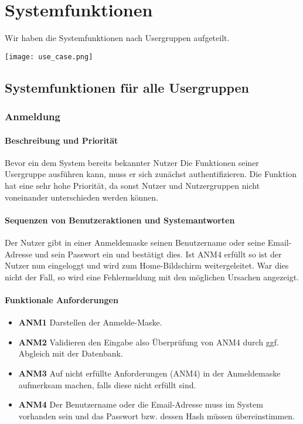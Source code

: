 \section{Systemfunktionen}
\label{system_features}

Wir haben die Systemfunktionen nach Usergruppen aufgeteilt.

\texttt{[image: use\_case.png]}

\subsection{Systemfunktionen für alle Usergruppen}
\subsubsection{Anmeldung}
\paragraph{Beschreibung und Priorität}

Bevor ein dem System bereits bekannter Nutzer Die Funktionen seiner Usergruppe ausführen kann, muss er sich zunächst authentifizieren. Die Funktion hat eine sehr hohe Priorität, da sonst Nutzer und Nutzergruppen nicht voneinander unterschieden werden können.

\paragraph{Sequenzen von Benutzeraktionen und Systemantworten}

Der Nutzer gibt in einer Anmeldemaske seinen Benutzername oder seine Email-Adresse und sein Passwort ein und bestätigt dies. Ist ANM4 erfüllt so ist der Nutzer nun eingeloggt und wird zum Home-Bildschirm weitergeleitet. War dies nicht der Fall, so wird eine Fehlermeldung mit den möglichen Ursachen angezeigt.

\paragraph{Funktionale Anforderungen}
\begin{itemize}
	\item \textbf{ANM1} Darstellen der Anmelde-Maske.
	\item \textbf{ANM2} Validieren den Eingabe also Überprüfung von ANM4 durch ggf. Abgleich mit der Datenbank.
	\item \textbf{ANM3} Auf nicht erfüllte Anforderungen (ANM4) in der Anmeldemaske aufmerksam machen, falls diese nicht erfüllt sind.
	\item \textbf{ANM4} Der Benutzername oder die Email-Adresse muss im System vorhanden sein und das Passwort bzw. dessen Hash müssen übereinstimmen.
\end{itemize}

